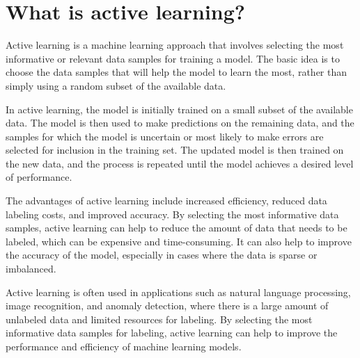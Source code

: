 \section{What is active learning?}
Active learning is a machine learning approach that involves selecting the most informative or relevant data samples for training a model. The basic idea is to choose the data samples that will help the model to learn the most, rather than simply using a random subset of the available data.

In active learning, the model is initially trained on a small subset of the available data. The model is then used to make predictions on the remaining data, and the samples for which the model is uncertain or most likely to make errors are selected for inclusion in the training set. The updated model is then trained on the new data, and the process is repeated until the model achieves a desired level of performance.

The advantages of active learning include increased efficiency, reduced data labeling costs, and improved accuracy. By selecting the most informative data samples, active learning can help to reduce the amount of data that needs to be labeled, which can be expensive and time-consuming. It can also help to improve the accuracy of the model, especially in cases where the data is sparse or imbalanced.

Active learning is often used in applications such as natural language processing, image recognition, and anomaly detection, where there is a large amount of unlabeled data and limited resources for labeling. By selecting the most informative data samples for labeling, active learning can help to improve the performance and efficiency of machine learning models.

